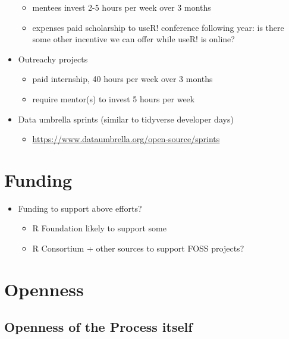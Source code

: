 \documentclass[]{book}
\providecommand{\tightlist}{%
  \setlength{\itemsep}{0pt}\setlength{\parskip}{0pt}}
\begin{document}
\begin{itemize}
  \begin{itemize}
  \tightlist
  \item
    mentees invest 2-5 hours per week over 3 months
  \item
    expenses paid scholarship to useR! conference following year: is there some other incentive we can offer while useR! is online?
  \end{itemize}
\item
  Outreachy projects

  \begin{itemize}
  \tightlist
  \item
    paid internship, 40 hours per week over 3 months
  \item
    require mentor(s) to invest 5 hours per week
  \end{itemize}
\item
  Data umbrella sprints (similar to tidyverse developer days)

  \begin{itemize}
  \tightlist
  \item
    \url{https://www.dataumbrella.org/open-source/sprints}
  \end{itemize}
\end{itemize}

\hypertarget{funding}{%
\chapter{Funding}\label{funding}}

\begin{itemize}
\tightlist
\item
  Funding to support above efforts?

  \begin{itemize}
  \tightlist
  \item
    R Foundation likely to support some
  \item
    R Consortium + other sources to support FOSS projects?
  \end{itemize}
\end{itemize}

\hypertarget{openness}{%
\chapter{Openness}\label{openness}}

\hypertarget{openness-of-the-process-itself}{%
\section{Openness of the Process itself}\label{openness-of-the-process-itself}}
\end{document}
